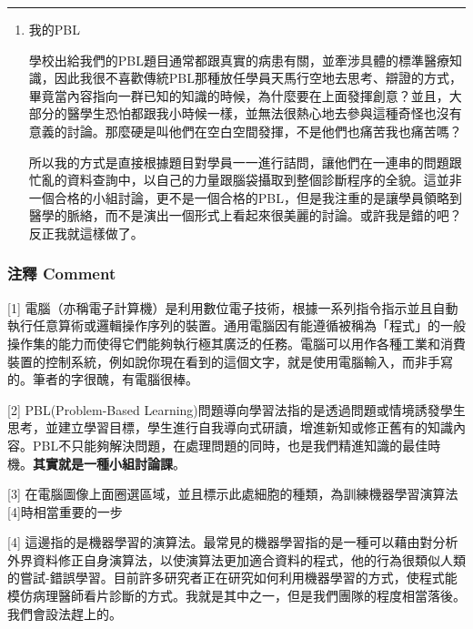 \documentclass[
]{article}
\begin{document}
\begin{center}\rule{0.5\linewidth}{\linethickness}\end{center}

\begin{enumerate}
\def\labelenumi{\arabic{enumi}.}
\setcounter{enumi}{1}
\item
  我的PBL

  學校出給我們的PBL題目通常都跟真實的病患有關，並牽涉具體的標準醫療知識，因此我很不喜歡傳統PBL那種放任學員天馬行空地去思考、辯證的方式，畢竟當內容指向一群已知的知識的時候，為什麼要在上面發揮創意？並且，大部分的醫學生恐怕都跟我小時候一樣，並無法很熱心地去參與這種奇怪也沒有意義的討論。那麼硬是叫他們在空白空間發揮，不是他們也痛苦我也痛苦嗎？

  所以我的方式是直接根據題目對學員一一進行詰問，讓他們在一連串的問題跟忙亂的資料查詢中，以自己的力量跟腦袋攝取到整個診斷程序的全貌。這並非一個合格的小組討論，更不是一個合格的PBL，但是我注重的是讓學員領略到醫學的脈絡，而不是演出一個形式上看起來很美麗的討論。或許我是錯的吧？反正我就這樣做了。
\end{enumerate}

\hypertarget{ux6ce8ux91cb-comment-2}{%
\subsubsection{注釋 Comment}\label{ux6ce8ux91cb-comment-2}}

{[}1{]}
電腦（亦稱電子計算機）是利用數位電子技術，根據一系列指令指示並且自動執行任意算術或邏輯操作序列的裝置。通用電腦因有能遵循被稱為「程式」的一般操作集的能力而使得它們能夠執行極其廣泛的任務。電腦可以用作各種工業和消費裝置的控制系統，例如說你現在看到的這個文字，就是使用電腦輸入，而非手寫的。筆者的字很醜，有電腦很棒。

{[}2{]} PBL(Problem-Based
Learning)問題導向學習法指的是透過問題或情境誘發學生思考，並建立學習目標，學生進行自我導向式研讀，增進新知或修正舊有的知識內容。PBL不只能夠解決問題，在處理問題的同時，也是我們精進知識的最佳時機。\textbf{其實就是一種小組討論課}。

{[}3{]}
在電腦圖像上面圈選區域，並且標示此處細胞的種類，為訓練機器學習演算法{[}4{]}時相當重要的一步

{[}4{]}
這邊指的是機器學習的演算法。最常見的機器學習指的是一種可以藉由對分析外界資料修正自身演算法，以使演算法更加適合資料的程式，他的行為很類似人類的嘗試-錯誤學習。目前許多研究者正在研究如何利用機器學習的方式，使程式能模仿病理醫師看片診斷的方式。我就是其中之一，但是我們團隊的程度相當落後。我們會設法趕上的。
\end{document}
